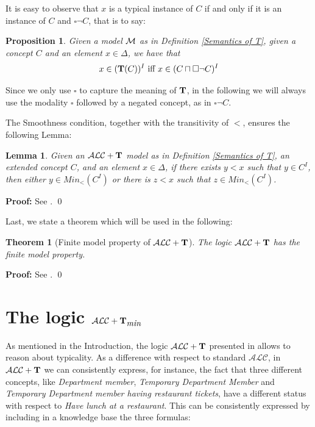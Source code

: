\documentclass[a4paper, 11pt, oneside]{duthesis}
\newcommand{\tip}{{\bf T}}
\newcommand{\alc}{\mathcal{ALC}}
\newcommand{\alct}{\mathcal{ALC}+\tip}
\newcommand{\alctmin}{\mathcal{ALC}+\tip_{\mbox{\em min}}}
\newcommand{\nott} {\lnot}
\newcommand{\bbox}{\square}
\newcommand{\emme} {\begin{mathcal}M\end{mathcal}}
\newenvironment{proof}
{\begin{trivlist} \item[] {\bf Proof:}}%
{\qed \end{trivlist}}
\newenvironment{proof}
{\begin{trivlist} \item[] {\bf Proof:}}%
{\qed \end{trivlist}}
\newtheorem{theorem}{Theorem}
\newtheorem{proposition}{Proposition}
\newtheorem{lemma}{Lemma}
\newcounter{posu}
\newtheorem{theorem}[posu]{Theorem}
\newtheorem{lemma}[posu]{Lemma}
\newtheorem{proposition}[posu]{Proposition}
\newtheorem{proof}[posu]{Proof}
\begin{document}
\noindent It is easy to observe that $x$ is a typical instance  of $C$ if and only if it is an instance of $C$ and $\bbox \nott C$, that is to say:

\begin{proposition}\label{Relation between T an box}
Given a model $\emme$ as in Definition \ref{Semantics of T}, given a concept $C$ and an element $x \in \Delta$, we have that $$x \in (\tip(C))^I \ \mbox{iff} \  x \in (C \sqcap \bbox \neg C)^I$$
\end{proposition}

\noindent
Since we only use $\bbox$ to capture the meaning of $\tip$, in the following we will always use the modality $\bbox$ followed by a negated concept, as in $\bbox \neg C$.

The Smoothness condition, together with the transitivity of $<$, ensures the following Lemma:

\begin{lemma}\label{ssc}
Given an $\alct$ model as in Definition \ref{Semantics of T}, an extended concept $C$, and an element $x \in \Delta$, if there exists $y < x$ such that $y \in C^I$, then either $y \in Min_<(C^I)$ or there is $z<x$ such that $z \in Min_<(C^I)$.
\end{lemma}

\begin{proof}
See \cite{Giordano:2013:NDL:2435476.2435957}.
\end{proof}


Last, we state a theorem which will be used in the following:

\begin{theorem}[Finite model property of $\alct$]\label{fmpALCT}
The logic $\alct$ has the finite model property.
\end{theorem}

\begin{proof}
See \cite{Giordano:2013:NDL:2435476.2435957}.
\end{proof}



\section{The logic $\alctmin$}\label{alctmin}

As mentioned in the Introduction, the logic $\alct$ presented in \cite{FI09} allows  to reason about typicality.
As a difference with respect to standard $\alc$, in $\alct$ we can consistently express, for instance, the fact that three different concepts, like {\em Department member}, {\em Temporary Department Member} and {\em Temporary Department member having restaurant tickets}, have a different status with respect to {\em Have lunch at a restaurant}. This can be consistently expressed by including in a knowledge base the three formulas:
\end{document}
